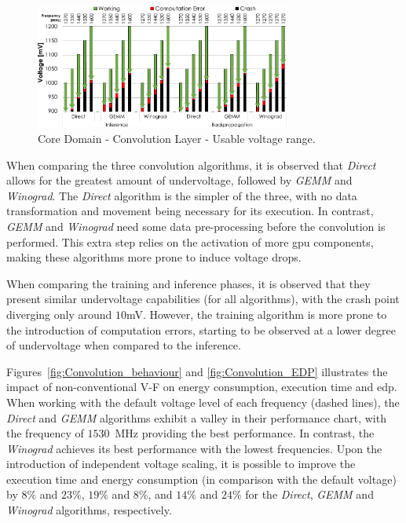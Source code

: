 \begin{figure}[htbp]
    \centering
        \includegraphics[width=0.75\textwidth]{Figures/Application To Deep Learning/Convolution_Guardband.pdf}
        \caption{Core Domain - Convolution Layer - Usable voltage range.}
    \label{fig:Convolution_guardband}
\end{figure}

When comparing the three convolution algorithms, it is observed that \textit{Direct} allows for the greatest amount of undervoltage, followed by \textit{GEMM} and \textit{Winograd}. The \textit{Direct} algorithm is the simpler of the three, with no data transformation and movement being necessary for its execution. In contrast, \textit{GEMM} and \textit{Winograd} need some data pre-processing before the convolution is performed. This extra step relies on the activation of more \acrshort{gpu} components, making these algorithms more prone to induce voltage drops. 

When comparing the training and inference phases, it is observed that they present similar undervoltage capabilities (for all algorithms), with the crash point diverging only around $10$mV. However, the training algorithm is more prone to the introduction of computation errors, starting to be observed at a lower degree of undervoltage when compared to the inference.

Figures~\ref{fig:Convolution_behaviour} and \ref{fig:Convolution_EDP} illustrates the impact of non-conventional V-F on energy consumption, execution time and \acrshort{edp}. When working with the default voltage level of each frequency (dashed lines), the \textit{Direct} and \textit{GEMM} algorithms exhibit a valley in their performance chart, with the frequency of $1530$~MHz providing the best performance. In contrast, the \textit{Winograd} achieves its best performance with the lowest frequencies. Upon the introduction of independent voltage scaling, it is possible to improve the execution time and energy consumption (in comparison with the default voltage) by $8\%$ and $23\%$, $19\%$ and $8\%$, and $14\%$ and $24\%$ for the \textit{Direct}, \textit{GEMM} and \textit{Winograd} algorithms, respectively. 

